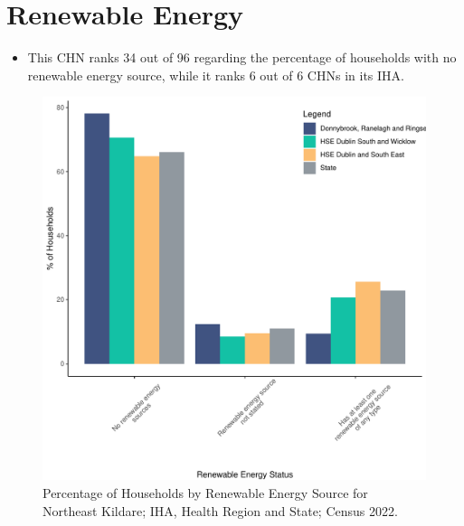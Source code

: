 \documentclass{article}
\begin{document}
\section{Renewable Energy}\label{sect:RE}
\begin{itemize}
\item This CHN ranks  34 out of 96 regarding the percentage of households with no renewable energy source, while it ranks   6 out of 6 CHNs in its IHA.
\end{itemize}
\begin{figure}[H]
	\centering
	\includegraphics[width = 140mm]{../figures/RenewableEnergyED.pdf}
	\caption{Percentage of Households by Renewable Energy Source for Northeast Kildare; IHA, Health Region and State; Census 2022.}
	\label{fig:vbnv}
	\end{figure}
\end{document}
